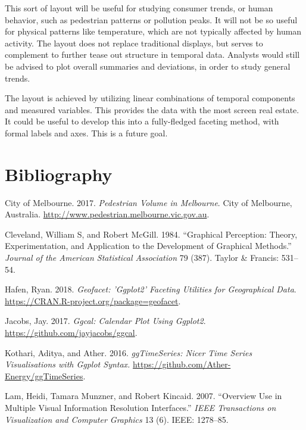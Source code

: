 This sort of layout will be useful for studying consumer trends, or
human behavior, such as pedestrian patterns or pollution peaks. It will
not be so useful for physical patterns like temperature, which are not
typically affected by human activity. The layout does not replace
traditional displays, but serves to complement to further tease out
structure in temporal data. Analysts would still be advised to plot
overall summaries and deviations, in order to study general trends.

The layout is achieved by utilizing linear combinations of temporal
components and measured variables. This provides the data with the most
screen real estate. It could be useful to develop this into a
fully-fledged faceting method, with formal labels and axes. This is a
future goal.

\hypertarget{bibliography}{%
\section*{Bibliography}\label{bibliography}}

\hypertarget{refs}{}
\leavevmode\hypertarget{ref-ped}{}%
City of Melbourne. 2017. \emph{Pedestrian Volume in Melbourne}. City of
Melbourne, Australia. \url{http://www.pedestrian.melbourne.vic.gov.au}.

\leavevmode\hypertarget{ref-cleveland1984graphical}{}%
Cleveland, William S, and Robert McGill. 1984. ``Graphical Perception:
Theory, Experimentation, and Application to the Development of Graphical
Methods.'' \emph{Journal of the American Statistical Association} 79
(387). Taylor \& Francis: 531--54.

\leavevmode\hypertarget{ref-R-geofacet}{}%
Hafen, Ryan. 2018. \emph{Geofacet: 'Ggplot2' Faceting Utilities for
Geographical Data}. \url{https://CRAN.R-project.org/package=geofacet}.

\leavevmode\hypertarget{ref-R-ggcal}{}%
Jacobs, Jay. 2017. \emph{Ggcal: Calendar Plot Using Ggplot2}.
\url{https://github.com/jayjacobs/ggcal}.

\leavevmode\hypertarget{ref-R-ggTimeSeries}{}%
Kothari, Aditya, and Ather. 2016. \emph{ggTimeSeries: Nicer Time Series
Visualisations with Ggplot Syntax.}
\url{https://github.com/Ather-Energy/ggTimeSeries}.

\leavevmode\hypertarget{ref-lam2007overview}{}%
Lam, Heidi, Tamara Munzner, and Robert Kincaid. 2007. ``Overview Use in
Multiple Visual Information Resolution Interfaces.'' \emph{IEEE
Transactions on Visualization and Computer Graphics} 13 (6). IEEE:
1278--85.


